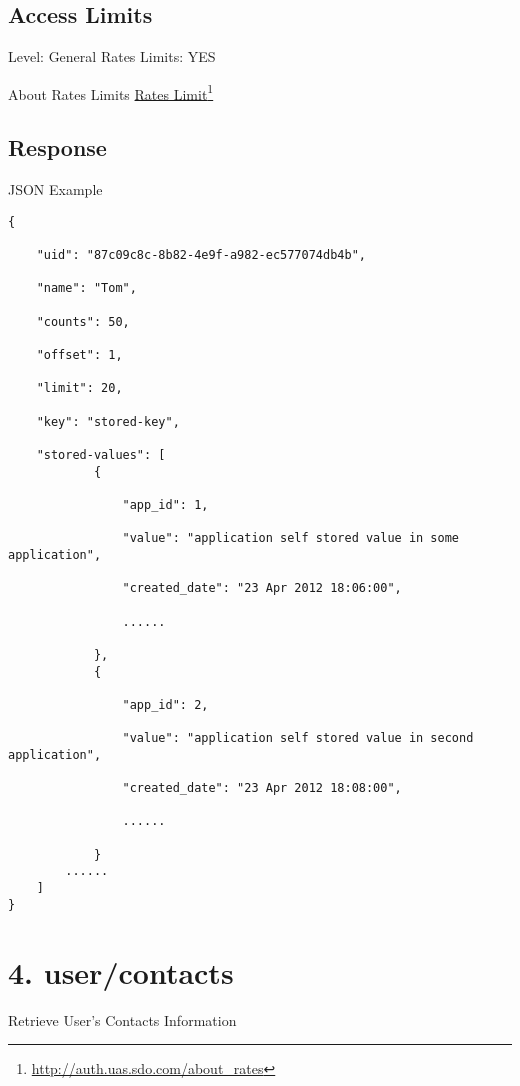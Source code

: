 \section{Access Limits}
\label{accesslimits}

Level: General
Rates Limits: YES

About Rates Limits \href{http://auth.uas.sdo.com/about_rates}{Rates Limit}\footnote{\href{http://auth.uas.sdo.com/about_rates}{http:/\slash auth.uas.sdo.com\slash about\_rates}}

\section{Response}
\label{response}

JSON Example

\begin{verbatim}
{

    "uid": "87c09c8c-8b82-4e9f-a982-ec577074db4b",

    "name": "Tom",  

    "counts": 50,  

    "offset": 1,  

    "limit": 20,  

    "key": "stored-key",

    "stored-values": [
            {

                "app_id": 1,

                "value": "application self stored value in some application",

                "created_date": "23 Apr 2012 18:06:00",

                ......

            },
            {

                "app_id": 2,

                "value": "application self stored value in second application",

                "created_date": "23 Apr 2012 18:08:00",

                ......

            }
        ......
    ]
}
\end{verbatim}


\chapter{4. user\slash contacts}
\label{usercontacts}

Retrieve User's Contacts Information

